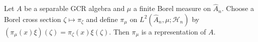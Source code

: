 Let $A$ be a separable GCR algebra and $\mu$ a finite Borel measure on $\hat{A}_n$. Choose a Borel cross section $\zeta \mapsto \pi_\zeta$ and define $\pi_\mu$ on $L^2(\hat{A}_n, \mu; \mathcal{H}_n)$ by $(\pi_\mu(x)\xi)(\zeta) = \pi_\zeta(x)\xi(\zeta)$. Then $\pi_\mu$ is a representation of $A$.
